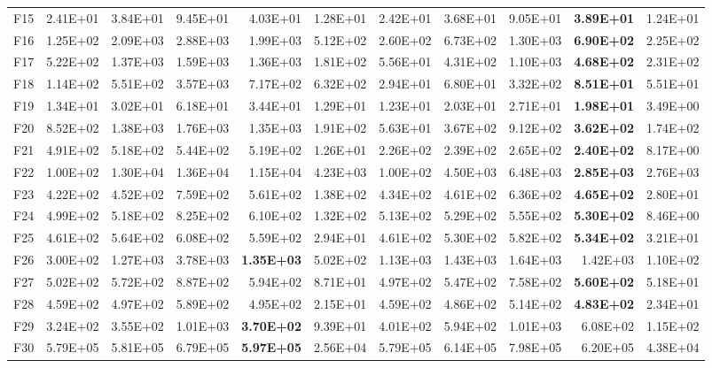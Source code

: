 \begin{tabular}{lrrrrrrrrrr}
F15 & 2.41E+01 & 3.84E+01 & 9.45E+01 & 4.03E+01 & 1.28E+01 & 2.42E+01 & 3.68E+01 & 9.05E+01 & \textbf{3.89E+01} & 1.24E+01 \\
F16 & 1.25E+02 & 2.09E+03 & 2.88E+03 & 1.99E+03 & 5.12E+02 & 2.60E+02 & 6.73E+02 & 1.30E+03 & \textbf{6.90E+02} & 2.25E+02 \\
F17 & 5.22E+02 & 1.37E+03 & 1.59E+03 & 1.36E+03 & 1.81E+02 & 5.56E+01 & 4.31E+02 & 1.10E+03 & \textbf{4.68E+02} & 2.31E+02 \\
F18 & 1.14E+02 & 5.51E+02 & 3.57E+03 & 7.17E+02 & 6.32E+02 & 2.94E+01 & 6.80E+01 & 3.32E+02 & \textbf{8.51E+01} & 5.51E+01 \\
F19 & 1.34E+01 & 3.02E+01 & 6.18E+01 & 3.44E+01 & 1.29E+01 & 1.23E+01 & 2.03E+01 & 2.71E+01 & \textbf{1.98E+01} & 3.49E+00 \\
F20 & 8.52E+02 & 1.38E+03 & 1.76E+03 & 1.35E+03 & 1.91E+02 & 5.63E+01 & 3.67E+02 & 9.12E+02 & \textbf{3.62E+02} & 1.74E+02 \\
F21 & 4.91E+02 & 5.18E+02 & 5.44E+02 & 5.19E+02 & 1.26E+01 & 2.26E+02 & 2.39E+02 & 2.65E+02 & \textbf{2.40E+02} & 8.17E+00 \\
F22 & 1.00E+02 & 1.30E+04 & 1.36E+04 & 1.15E+04 & 4.23E+03 & 1.00E+02 & 4.50E+03 & 6.48E+03 & \textbf{2.85E+03} & 2.76E+03 \\
F23 & 4.22E+02 & 4.52E+02 & 7.59E+02 & 5.61E+02 & 1.38E+02 & 4.34E+02 & 4.61E+02 & 6.36E+02 & \textbf{4.65E+02} & 2.80E+01 \\
F24 & 4.99E+02 & 5.18E+02 & 8.25E+02 & 6.10E+02 & 1.32E+02 & 5.13E+02 & 5.29E+02 & 5.55E+02 & \textbf{5.30E+02} & 8.46E+00 \\
F25 & 4.61E+02 & 5.64E+02 & 6.08E+02 & 5.59E+02 & 2.94E+01 & 4.61E+02 & 5.30E+02 & 5.82E+02 & \textbf{5.34E+02} & 3.21E+01 \\
F26 & 3.00E+02 & 1.27E+03 & 3.78E+03 & \textbf{1.35E+03} & 5.02E+02 & 1.13E+03 & 1.43E+03 & 1.64E+03 & 1.42E+03 & 1.10E+02 \\
F27 & 5.02E+02 & 5.72E+02 & 8.87E+02 & 5.94E+02 & 8.71E+01 & 4.97E+02 & 5.47E+02 & 7.58E+02 & \textbf{5.60E+02} & 5.18E+01 \\
F28 & 4.59E+02 & 4.97E+02 & 5.89E+02 & 4.95E+02 & 2.15E+01 & 4.59E+02 & 4.86E+02 & 5.14E+02 & \textbf{4.83E+02} & 2.34E+01 \\
F29 & 3.24E+02 & 3.55E+02 & 1.01E+03 & \textbf{3.70E+02} & 9.39E+01 & 4.01E+02 & 5.94E+02 & 1.01E+03 & 6.08E+02 & 1.15E+02 \\
F30 & 5.79E+05 & 5.81E+05 & 6.79E+05 & \textbf{5.97E+05} & 2.56E+04 & 5.79E+05 & 6.14E+05 & 7.98E+05 & 6.20E+05 & 4.38E+04 \\
\bottomrule
\end{tabular}
